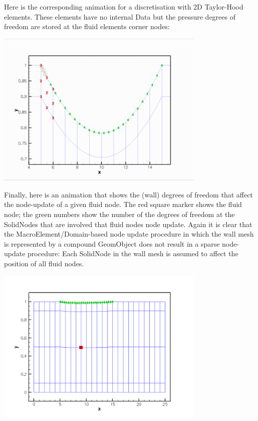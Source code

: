 \begin{DoxyItemize}
Here is the corresponding animation for a discretisation with 2D Taylor-\/\+Hood elements. These elements have no internal {\ttfamily Data} but the pressure degrees of freedom are stored at the fluid element\textquotesingle{}s corner nodes\+:  
\begin{DoxyImage}
\includegraphics[width=0.75\textwidth]{taylor_hood_fsi_macro}
\end{DoxyImage}

\end{DoxyItemize}

Finally, here is an animation that shows the (wall) degrees of freedom that affect the node-\/update of a given fluid node. The red square marker shows the fluid node; the green numbers show the number of the degrees of freedom at the {\ttfamily Solid\+Nodes} that are involved that fluid node\textquotesingle{}s node update. Again it is clear that the {\ttfamily Macro\+Element/\+Domain-\/based} node update procedure in which the wall mesh is represented by a compound {\ttfamily Geom\+Object} does not result in a sparse node-\/update procedure\+: Each {\ttfamily Solid\+Node} in the wall mesh is assumed to affect the position of all fluid nodes.

 
\begin{DoxyImage}
\includegraphics[width=0.75\textwidth]{fsi_nodes}
\end{DoxyImage}







